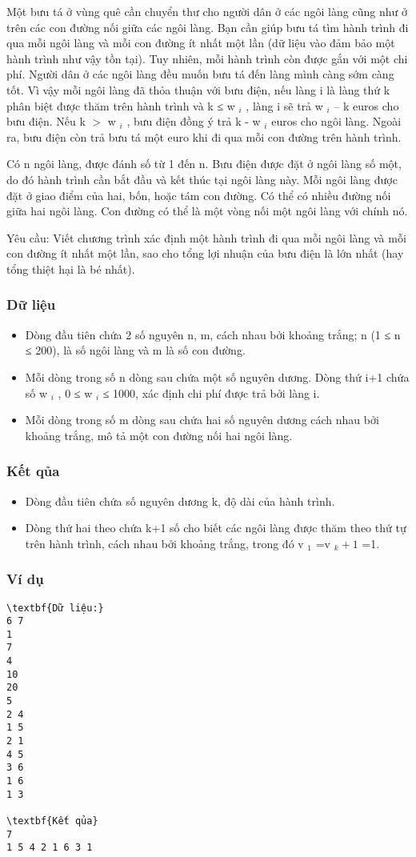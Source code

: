 



   Một bưu tá ở vùng quê cần chuyển thư cho người dân ở các ngôi làng cũng như ở trên các con đường nối giữa các ngôi làng. Bạn cần giúp bưu tá tìm hành trình đi qua mỗi ngôi làng và mỗi con đường ít   nhất một lần (dữ liệu vào đảm bảo một hành trình như vậy tồn tại). Tuy nhiên, mỗi hành trình còn được gắn với một chi phí. Người dân ở các ngôi làng đều muốn bưu tá đến làng mình càng sớm càng tốt. Vì vậy   mỗi ngôi làng đã thỏa thuận với bưu điện, nếu làng i là làng thứ k phân biệt được thăm trên hành trình và k ≤ w   $_    i   $   , làng i sẽ trả w   $_    i   $   – k euros cho bưu điện. Nếu k $>$ w   $_    i   $   ,   bưu điện đồng ý trả k - w   $_    i   $   euros cho ngôi làng. Ngoài ra, bưu điện còn trả bưu tá một euro khi đi qua mỗi con đường trên hành trình.  

   Có n ngôi làng, được đánh số từ 1 đến n. Bưu điện được đặt ở ngôi làng số một, do đó hành trình cần bắt đầu và kết thúc tại ngôi làng này. Mỗi ngôi làng được đặt ở giao điểm của hai, bốn, hoặc tám con   đường. Có thể có nhiều đường nối giữa hai ngôi làng. Con đường có thể là một vòng nối một ngôi làng với chính nó.  

   Yêu cầu: Viết chương trình xác định một hành trình đi qua mỗi ngôi làng và mỗi con đường ít nhất một lần, sao cho tổng lợi nhuận của bưu điện là lớn nhất (hay tổng thiệt hại là bé nhất).  

\subsubsection{   Dữ liệu  }
\begin{itemize}
	\item     Dòng đầu tiên chứa 2 số nguyên n, m, cách nhau bởi khoảng trắng; n (1 ≤ n ≤ 200), là số ngôi làng và m là số con đường.   
	\item     Mỗi dòng trong số n dòng sau chứa một số nguyên dương. Dòng thứ i+1 chứa số w    $_     i    $    , 0  ≤  w    $_     i    $    ≤ 1000, xác định chi phí được trả bởi làng i.   
	\item     Mỗi dòng trong số m dòng sau chứa hai số nguyên dương cách nhau bởi khoảng trắng, mô tả một con đường nối hai ngôi làng.   
\end{itemize}

\subsubsection{   Kết qủa  }
\begin{itemize}
	\item     Dòng đầu tiên chứa số nguyên dương k, độ dài của hành trình.   
	\item     Dòng thứ hai theo chứa k+1 số cho biết các ngôi làng được thăm theo thứ tự trên hành trình, cách nhau bởi khoảng trắng, trong đó v    $_     1    $    =v    $_     k+1    $    =1.   
\end{itemize}

\subsubsection{   Ví dụ  }
\begin{verbatim}
\textbf{Dữ liệu:}
6 7
1
7
4
10
20
5
2 4
1 5
2 1
4 5
3 6
1 6
1 3

\textbf{Kết qủa}
7
1 5 4 2 1 6 3 1
\end{verbatim}